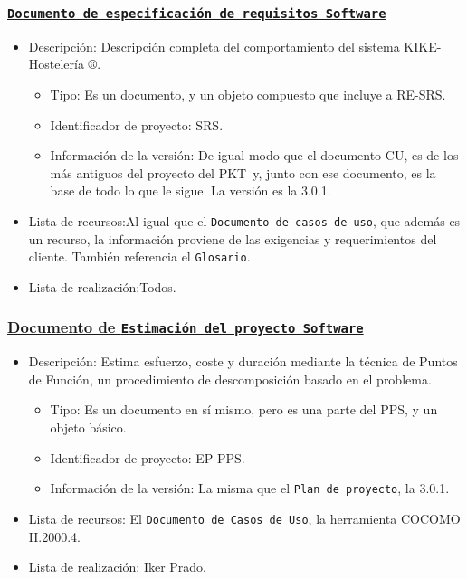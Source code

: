 \documentclass[spanish,a4paper,11pt, twoside]{report}	%
\newcommand*{\PKT}{\hbox{P}\kern-2.5pt\lower3.5pt\hbox{\small{K}}\kern-2.8pt\hbox{T}\kern-2pt}	%
\begin{document}
			\subsubsection{\texttt{\underline{Documento de especificación de requisitos Software}}}
			\begin{itemize}	
				\item{Descripción:} Descripción completa del comportamiento del sistema KIKE- Hostelería ®.
					\begin{itemize}	
						\item{Tipo:} Es un documento, y un objeto compuesto que incluye a RE-SRS. 
						\item{Identificador de proyecto:} SRS.
						\item{Información de la versión:} De igual modo que el documento CU, es de los más antiguos del proyecto del \PKT \ y, junto con ese documento, es la base de todo lo que le sigue. La versión es la 3.0.1.
					\end{itemize}	
				\item{Lista de recursos:}Al igual que el \texttt{Documento de casos de uso}, que además  es un recurso, la información proviene de las exigencias y requerimientos del cliente. También referencia el \texttt{Glosario}.
				\item{Lista de realización:}Todos.
			\end{itemize}			

			\subsubsection{\underline{Documento de \texttt{Estimación del proyecto Software}}}
			\begin{itemize}	
				\item{Descripción:} Estima esfuerzo, coste y duración mediante la técnica de Puntos de Función, un procedimiento de descomposición basado en el problema.
					\begin{itemize}	
						\item{Tipo:} Es un documento en sí mismo, pero es una parte del PPS, y un objeto básico. 
						\item{Identificador de proyecto:} EP-PPS.
						\item{Información de la versión:} La misma que el \texttt{Plan de proyecto}, la 3.0.1.
					\end{itemize}	
				\item{Lista de recursos:} El \texttt{Documento de Casos de Uso}, la herramienta COCOMO II.2000.4.
				\item{Lista de realización:} Iker Prado.
			\end{itemize}		
			
\end{document}

